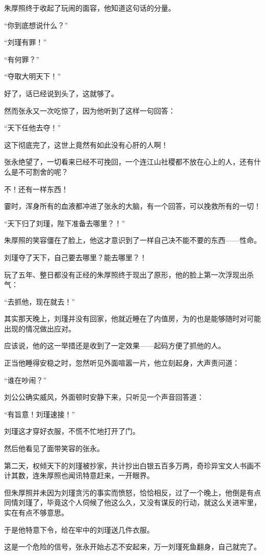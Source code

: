 \begin{multicols}{\theparacolNo}
朱厚照终于收起了玩闹的面容，他知道这句话的分量。

“你到底想说什么？”

“刘瑾有罪！”

“有何罪？”

“夺取大明天下！”

好了，话已经说到头了，这就够了。

然而张永又一次吃惊了，因为他听到了这样一句回答：

“天下任他去夺！”

这下彻底完了，这世上竟然有如此没有心肝的人啊！

张永绝望了，一切看来已经不可挽回，一个连江山社稷都不放在心上的人，还有什么是不可割舍的呢？

不！还有一样东西！

霎时，浑身所有的血液都冲进了张永的大脑，有一个回答，可以挽救所有的一切！

“天下归了刘瑾，陛下准备去哪里？！”

朱厚照的笑容僵在了脸上，他这才意识到了一样自己决不能不要的东西——性命。

刘瑾夺了天下，自己要去哪里？能去哪里？！

玩了五年、整日都没有正经的朱厚照终于现出了原形，他的脸上第一次浮现出杀气：

“去抓他，现在就去！”

其实那天晚上，刘瑾并没有回家，他就近睡在了内值房，为的也是能够随时对可能出现的情况做出应对。

应该说，他的这一举措还是收到了一定效果——起码方便了抓他的人。

正当他睡得安稳之时，忽然听见外面喧嚣一片，他立刻起身，大声责问道：

“谁在吵闹？”

刘公公确实威风，外面顿时安静下来，只听见一个声音回答道：

“有旨意！刘瑾速接！”

刘瑾这才穿好衣服，不慌不忙地打开了门。

然后他看见了面带笑容的张永。

第二天，权倾天下的刘瑾被抄家，共计抄出白银五百多万两，奇珍异宝文人书画不计其数，连朱厚照也闻讯特意赶来，一开眼界。

但朱厚照并未因为刘瑾贪污的事实而愤怒，恰恰相反，过了一个晚上，他倒是有点同情刘瑾了，毕竟这个人伺候了他这么久，又没有谋反的行动，就这么关进牢里，实在有点不够意思。

于是他特意下令，给在牢中的刘瑾送几件衣服。

这是一个危险的信号，张永开始忐忑不安起来，万一刘瑾死鱼翻身，自己就完了。


\end{multicols}
